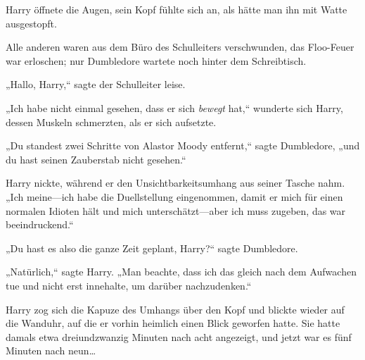 \later

Harry öffnete die Augen, sein Kopf fühlte sich an, als hätte man ihn mit Watte ausgestopft.

Alle anderen waren aus dem Büro des Schulleiters verschwunden, das Floo-Feuer war erloschen; nur Dumbledore wartete noch hinter dem Schreibtisch.

„Hallo, Harry,“ sagte der Schulleiter leise.

„Ich habe nicht einmal gesehen, dass er sich \emph{bewegt} hat,“ wunderte sich Harry, dessen Muskeln schmerzten, als er sich aufsetzte.

„Du standest zwei Schritte von Alastor Moody entfernt,“ sagte Dumbledore, „und du hast seinen Zauberstab nicht gesehen.“

Harry nickte, während er den Unsichtbarkeitsumhang aus seiner Tasche nahm. „Ich meine—ich habe die Duellstellung eingenommen, damit er mich für einen normalen Idioten hält und mich unterschätzt—aber ich muss zugeben, das war beeindruckend.“

„Du hast es also die ganze Zeit geplant, Harry?“ sagte Dumbledore.

„Natürlich,“ sagte Harry. „Man beachte, dass ich das gleich nach dem Aufwachen tue und nicht erst innehalte, um darüber nachzudenken.“


Harry zog sich die Kapuze des Umhangs über den Kopf und blickte wieder auf die Wanduhr, auf die er vorhin heimlich einen Blick geworfen hatte. Sie hatte damals etwa dreiundzwanzig Minuten nach acht angezeigt, und jetzt war es fünf Minuten nach neun…


